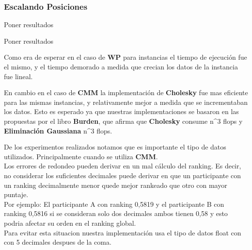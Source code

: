 \subsubsection{Escalando Posiciones}


Poner resultados



Poner resultados




Como era de esperar en el caso de \textbf{WP} para instancias el tiempo de ejecución fue el mismo, y el tiempo demorado a medida que crecian los datos de la instancia fue lineal.

En cambio en el caso de \textbf{CMM} la implementación de \textbf{Cholesky} fue mas eficiente para las mismas instancias, y relativamente mejor a medida que se incrementaban los datos. Esto es esperado ya que nuestras implementaciones se basaron en las propuestas por el libro \textbf{Burden}, que afirma que \textbf{Cholesky} consume  n^3 flops y \textbf{Eliminación Gaussiana}  n^3 flops.



De los experimentos realizados notamos que es importante el tipo de datos utilizados. Principalmente cuando se utiliza \textbf{CMM}.
\\

Los errores de redondeo pueden derivar en un mal cálculo del ranking. Es decir, no considerar los suficientes decimales puede derivar en que un participante con un ranking decimalmente menor quede mejor rankeado que otro con mayor puntaje.\\

Por ejemplo: El participante A con ranking 0,5819 y el participante B con ranking 0,5816 si se consideran solo dos decimales ambos tienen 0,58 y esto podria afectar su orden en el ranking global. \\

Para evitar esta situacion nuestra implementación usa el tipo de datos float con con 5 decimales despues de la coma.\\
















